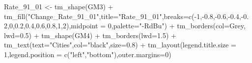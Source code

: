\documentclass[
]{article}
\newenvironment{Shaded}{\begin{snugshade}}{\end{snugshade}}
\newcommand{\AttributeTok}[1]{\textcolor[rgb]{0.77,0.63,0.00}{#1}}
\newcommand{\DecValTok}[1]{\textcolor[rgb]{0.00,0.00,0.81}{#1}}
\newcommand{\FloatTok}[1]{\textcolor[rgb]{0.00,0.00,0.81}{#1}}
\newcommand{\FunctionTok}[1]{\textcolor[rgb]{0.00,0.00,0.00}{#1}}
\newcommand{\NormalTok}[1]{#1}
\newcommand{\OtherTok}[1]{\textcolor[rgb]{0.56,0.35,0.01}{#1}}
\newcommand{\SpecialCharTok}[1]{\textcolor[rgb]{0.00,0.00,0.00}{#1}}
\newcommand{\StringTok}[1]{\textcolor[rgb]{0.31,0.60,0.02}{#1}}
\begin{document}
\begin{Shaded}
\begin{Highlighting}[]
\NormalTok{Rate\_91\_01 }\OtherTok{\textless{}{-}} \FunctionTok{tm\_shape}\NormalTok{(GM3) }\SpecialCharTok{+}
  \FunctionTok{tm\_fill}\NormalTok{(}\StringTok{"Change\_Rate\_91\_01"}\NormalTok{,}\AttributeTok{title=}\StringTok{"Rate\_91\_01"}\NormalTok{,}\AttributeTok{breaks=}\FunctionTok{c}\NormalTok{(}\SpecialCharTok{{-}}\DecValTok{1}\NormalTok{,}\SpecialCharTok{{-}}\FloatTok{0.8}\NormalTok{,}\SpecialCharTok{{-}}\FloatTok{0.6}\NormalTok{,}\SpecialCharTok{{-}}\FloatTok{0.4}\NormalTok{,}\SpecialCharTok{{-}}\FloatTok{0.2}\NormalTok{,}\DecValTok{0}\NormalTok{,}\FloatTok{0.2}\NormalTok{,}\FloatTok{0.4}\NormalTok{,}\FloatTok{0.6}\NormalTok{,}\FloatTok{0.8}\NormalTok{,}\DecValTok{1}\NormalTok{,}\DecValTok{2}\NormalTok{),}\AttributeTok{midpoint =} \DecValTok{0}\NormalTok{,}\AttributeTok{palette=}\StringTok{"{-}RdBu"}\NormalTok{)  }\SpecialCharTok{+}
  \FunctionTok{tm\_borders}\NormalTok{(}\AttributeTok{col=}\StringTok{\textquotesingle{}Grey\textquotesingle{}}\NormalTok{, }\AttributeTok{lwd=}\FloatTok{0.5}\NormalTok{) }\SpecialCharTok{+}
\FunctionTok{tm\_shape}\NormalTok{(GM4) }\SpecialCharTok{+}
  \FunctionTok{tm\_borders}\NormalTok{(}\AttributeTok{lwd=}\FloatTok{1.5}\NormalTok{) }\SpecialCharTok{+}
  \FunctionTok{tm\_text}\NormalTok{(}\AttributeTok{text=}\StringTok{"Cities"}\NormalTok{,}\AttributeTok{col=}\StringTok{"black"}\NormalTok{,}\AttributeTok{size=}\FloatTok{0.8}\NormalTok{) }\SpecialCharTok{+}
\FunctionTok{tm\_layout}\NormalTok{(}\AttributeTok{legend.title.size =} \DecValTok{1}\NormalTok{,}\AttributeTok{legend.position =} \FunctionTok{c}\NormalTok{(}\StringTok{"left"}\NormalTok{,}\StringTok{"bottom"}\NormalTok{),}\AttributeTok{outer.margins=}\DecValTok{0}\NormalTok{)}


\end{Highlighting}
\end{Shaded}
\end{document}
